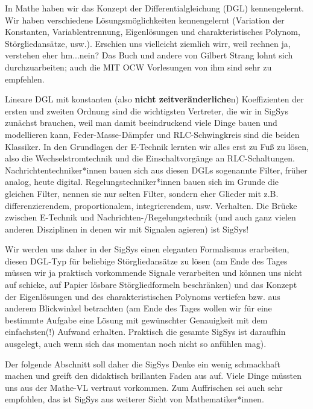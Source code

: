 In Mathe haben wir das Konzept der Differentialgleichung (DGL) kennengelernt.
%
Wir haben verschiedene Lösungsmöglichkeiten kennengelernt (Variation
der Konstanten, Variablentrennung, Eigenlösungen und charakteristisches Polynom,
Störgliedansätze, usw.). Erschien uns vielleicht ziemlich wirr, weil rechnen
ja, verstehen eher hm...nein? Das Buch \cite{Strang2014} und andere von Gilbert Strang
lohnt sich durchzuarbeiten; auch die MIT OCW Vorlesungen von ihm sind sehr zu empfehlen.


Lineare DGL mit konstanten (also \textbf{nicht zeitveränderliche}n) Koeffizienten der
ersten und zweiten Ordnung sind die wichtigsten Vertreter, die wir in SigSys
zunächst brauchen, weil man damit beeindruckend viele Dinge bauen und modellieren
kann, Feder-Masse-Dämpfer und RLC-Schwingkreis sind die beiden Klassiker.
%
In den Grundlagen der E-Technik lernten wir alles erst zu Fuß zu lösen, also
die Wechselstromtechnik und die Einschaltvorgänge an RLC-Schaltungen.
%
Nachrichtentechniker*innen bauen sich aus diesen DGLs sogenannte Filter,
früher analog, heute digital.
%
Regelungstechniker*innen bauen sich im Grunde die gleichen Filter, nennen sie nur
selten Filter, sondern eher Glieder mit z.B. differenzierendem, proportionalem,
integrierendem, usw. Verhalten.
%
Die Brücke zwischen E-Technik und Nachrichten-/Regelungstechnik (und auch
ganz vielen anderen Disziplinen in denen wir mit Signalen agieren) ist SigSys!

Wir werden uns daher in der SigSys einen eleganten Formalismus erarbeiten,
diesen DGL-Typ für beliebige Störgliedansätze zu lösen (am Ende des Tages
müssen wir ja praktisch vorkommende Signale verarbeiten und können uns nicht
auf schicke, auf Papier lösbare Störgliedformeln beschränken)
und das Konzept der Eigenlösungen und des charakteristischen
Polynoms vertiefen bzw. aus anderem Blickwinkel betrachten (am Ende des Tages
wollen wir für eine bestimmte Aufgabe eine Lösung mit gewünschter Genauigkeit
mit dem einfachsten(!) Aufwand erhalten. Praktisch die gesamte SigSys ist daraufhin
ausgelegt, auch wenn sich das momentan noch nicht so anfühlen mag).

Der folgende Abschnitt soll daher die SigSys Denke ein wenig schmackhaft machen und
greift den didaktisch brillanten Faden aus \cite{Strang2014} auf. Viele Dinge
müssten uns aus der Mathe-VL vertraut vorkommen.
%
Zum Auffrischen sei auch \cite{Burg2013} sehr empfohlen, das ist SigSys aus weiterer
Sicht von Mathematiker*innen.
%
